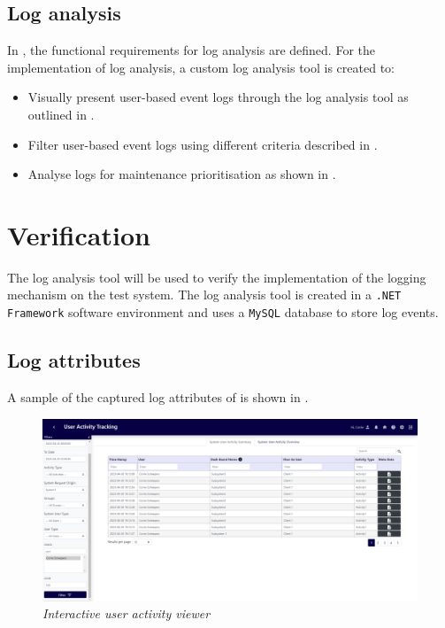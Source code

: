 \clearpage

\subsection{Log analysis}\label{sec:ch3_implementationLogAnalysis}
In , the functional requirements for log analysis are defined. For the implementation of log analysis, a custom log analysis tool is created to:

\begin{itemize}
	\item Visually present user-based event logs through the log analysis tool as outlined in .
	\item Filter user-based event logs using different criteria described in .
	\item Analyse logs for maintenance prioritisation as shown in .
\end{itemize}

\section{Verification}\label{sec:ch3_Verification}
The log analysis tool will be used to verify the implementation of the logging mechanism on the test system. The log analysis tool is created in a \texttt{.NET Framework} software environment and uses a \texttt{MySQL} database to store log events.

\subsection{Log attributes}
A sample of the captured log attributes of  is shown in .

\begin{figure}[!htb]
	\centering %
	\includegraphics[width=0.99\linewidth]{img/ch3/analysis/UAT_menu.png}
	\caption[Interactive user activity viewer]
	{\textit{Interactive user activity viewer}}\label{fig:ch3_UAT_menu}
\end{figure}

